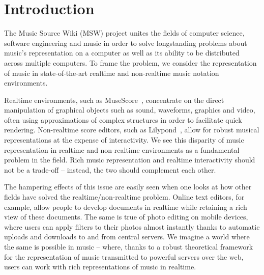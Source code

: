 \documentclass{article}
\title{\papertitle}
\begin{document}
%
\capstartfalse
\maketitle
\capstarttrue
%
\begin{abstract}
The Music Source Wiki project aims to create a wiki for the collective
editing, visualization and auralization of musical-source documents on
the web. It will do so by developing a robust music representation language
that describes several music phenomena (notation, audio, processes) through
a small axiomatic language. A web API will be created to transmit this
language between terminals, and a wiki-like website will allow for the
realtime editing and just-in-time compilation of musical source documents.
The present paper presents the basic objectives of the project as well as
three major phases into which the research and development will be divided.
The project is a joint endeavor between researchers
affiliated with the Grame (Lyon) and the Sibelius Academy (Finland).
\end{abstract}
%

\section{Introduction}\label{sec:introduction}
The Music Source Wiki (MSW) project unites the fields of computer science, software
engineering and music in order to solve longstanding problems about music’s
representation on a computer as well as its ability to be distributed across
multiple computers. To frame the problem, we consider the representation of
music in state-of-the-art real\-time and non-real\-time music notation
environments.

Realtime environments, such as MuseScore~\cite{musescore}, concentrate on
the direct manipulation of graphical objects such as sound, waveforms,
graphics and video, often using approximations of complex structures in
order to facilitate quick rendering. Non-real\-time score editors, such as
Lilypond~\cite{lilypond06}, allow for robust musical representations at the expense of
interactivity. We see this disparity of music representation in real\-time and
non-real\-time environments as a fundamental problem in the field. Rich music
representation and real\-time interactivity should not be a trade-off –
instead, the two should complement each other.

The hampering effects of this issue are easily seen when one looks at how
other fields have solved the real\-time/non-real\-time problem. Online text
editors, for example, allow people to develop documents in real\-time while
retaining a rich view of these documents. The same is true of photo editing
on mobile devices, where users can apply filters to their photos almost
instantly thanks to automatic uploads and downloads to and from central
servers. We imagine a world where the same is possible in music – where,
thanks to a robust theoretical framework for the representation of music
transmitted to powerful servers over the web, users can work with rich
representations of music in real\-time.
\end{document}

